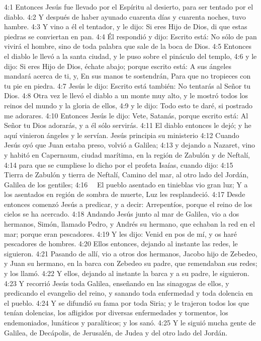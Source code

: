 4:1 Entonces Jesús fue llevado por el Espíritu al desierto, para ser tentado por el diablo. 
4:2 Y después de haber ayunado cuarenta días y cuarenta noches, tuvo hambre. 
4:3 Y vino a él el tentador, y le dijo: Si eres Hijo de Dios, di que estas piedras se conviertan en pan. 
4:4 Él respondió y dijo: Escrito está: No sólo de pan vivirá el hombre, sino de toda palabra que sale de la boca de Dios. 
4:5 Entonces el diablo le llevó a la santa ciudad, y le puso sobre el pináculo del templo, 
4:6 y le dijo: Si eres Hijo de Dios, échate abajo; porque escrito está: 
A sus ángeles mandará acerca de ti, 
y, 
En sus manos te sostendrán, 
Para que no tropieces con tu pie en piedra. 
4:7 Jesús le dijo: Escrito está también: No tentarás al Señor tu Dios. 
4:8 Otra vez le llevó el diablo a un monte muy alto, y le mostró todos los reinos del mundo y la gloria de ellos, 
4:9 y le dijo: Todo esto te daré, si postrado me adorares. 
4:10 Entonces Jesús le dijo: Vete, Satanás, porque escrito está: Al Señor tu Dios adorarás, y a él sólo servirás. 
4:11 El diablo entonces le dejó; y he aquí vinieron ángeles y le servían. 
Jesús principia su ministerio  
4:12 Cuando Jesús oyó que Juan estaba preso, volvió a Galilea; 
4:13 y dejando a Nazaret, vino y habitó en Capernaum, ciudad marítima, en la región de Zabulón y de Neftalí, 
4:14 para que se cumpliese lo dicho por el profeta Isaías, cuando dijo: 
4:15   Tierra de Zabulón y tierra de Neftalí, 
Camino del mar, al otro lado del Jordán, 
Galilea de los gentiles; 
4:16   El pueblo asentado en tinieblas vio gran luz; 
Y a los asentados en región de sombra de muerte, 
Luz les resplandeció. 
4:17 Desde entonces comenzó Jesús a predicar, y a decir: Arrepentíos, porque el reino de los cielos se ha acercado. 
4:18 Andando Jesús junto al mar de Galilea, vio a dos hermanos, Simón, llamado Pedro, y Andrés su hermano, que echaban la red en el mar; porque eran pescadores. 
4:19 Y les dijo: Venid en pos de mí, y os haré pescadores de hombres. 
4:20 Ellos entonces, dejando al instante las redes, le siguieron. 
4:21 Pasando de allí, vio a otros dos hermanos, Jacobo hijo de Zebedeo, y Juan su hermano, en la barca con Zebedeo su padre, que remendaban sus redes; y los llamó. 
4:22 Y ellos, dejando al instante la barca y a su padre, le siguieron. 
4:23 Y recorrió Jesús toda Galilea, enseñando en las sinagogas de ellos, y predicando el evangelio del reino, y sanando toda enfermedad y toda dolencia en el pueblo. 
4:24 Y se difundió su fama por toda Siria; y le trajeron todos los que tenían dolencias, los afligidos por diversas enfermedades y tormentos, los endemoniados, lunáticos y paralíticos; y los sanó. 
4:25 Y le siguió mucha gente de Galilea, de Decápolis, de Jerusalén, de Judea y del otro lado del Jordán. 
